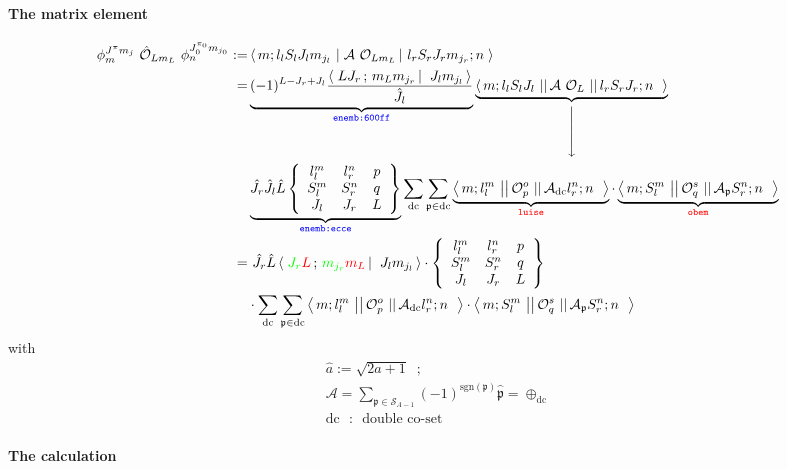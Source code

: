 \documentclass[onecolumn,preprint,superscriptaddress,nofootinbib,notitlepage,10pt,linenumbers]{revtex4-1}
\newcommand{\xdownarrow}[1]{%
  {\left\downarrow\vbox to #1{}\right.\kern-\nulldelimiterspace}
}
\newcommand{\red}[1]{\textcolor{red}{#1}}
\newcommand{\blue}[1]{\textcolor{blue}{#1}}
\newcommand{\green}[1]{\textcolor{green}{#1}}
\newcommand{\la}{\label}
\newcommand{\me}[3] {\left\langle\,#1\,\left|\left.\,#2\,\right|\,#3\,\right.\right\rangle}
\newcommand{\redme}[3] {\left\langle\,#1\,\left|\left|\,#2\,\left|\left|\,#3\,\right.\right.\right.\right.\right\rangle}
\newcommand{\clg}[6]{\ensuremath{\left\langle\left.\,#1#2\,;\,#3#4\,\right\vert\right.\left.\,#5#6\,\right\rangle}}
\begin{document}
\paragraph{The matrix element}
\begin{align}\la{eq.me}
\phi^{J^\pi m_j}_m~\hat{\mathcal{O}}_{Lm_L}~\phi^{J_0^{\pi_0}m_{j_0}}_n:=&
\me{m;l_lS_lJ_lm_{j_l}}{\mathcal{A}~\mathcal{O}_{Lm_L}}{l_rS_rJ_rm_{j_r};n} \\
=&\underbrace{(-1)^{L-J_r+J_l}\frac{\clg{L}{J_r}{m_L}{m_{j_r}}{J_l}{m_{j_l}}}{\hat{J_l}}}_
{\blue{\texttt{enemb:600ff}}}
\underbrace{\redme{m;l_lS_lJ_l}{\mathcal{A}~\mathcal{O}_{L}}{l_rS_rJ_r;n}}_{\xdownarrow{.75cm}}\\
&\underbrace{\hat{J_r}\hat{J_l}\hat{L}
\left\lbrace\begin{array}{ccc}l^m_l & l^n_r & p\\ S^m_l & S^n_r & q \\ J_l & J_r & L\end{array}\right\rbrace}_{\blue{\texttt{enemb:ecce}}}
\sum_\text{dc}\sum_{\mathfrak{p}\in\text{dc}}
\underbrace{\redme{m;l^m_l}{\mathcal{O}^o_p}{\mathcal{A}_\text{dc}l^n_r;n}}_{\red{\texttt{luise}}}\cdot
\underbrace{\redme{m;S^m_l}{\mathcal{O}^s_q}{\mathcal{A}_\mathfrak{p}S^n_r;n}}_{\red{\texttt{obem}}}\\
=&~\hat{J_r}\hat{L}\clg{\green{J_r}}{\red{L}}{\green{m_{j_r}}}{\red{m_L}}{J_l}{m_{j_l}}\cdot
\left\lbrace\begin{array}{ccc}l^m_l & l^n_r & p\\ S^m_l & S^n_r & q \\ J_l & J_r & L\end{array}\right\rbrace\\
&\cdot\sum_\text{dc}\sum_{\mathfrak{p}\in\text{dc}}
\redme{m;l^m_l}{\mathcal{O}^o_p}{\mathcal{A}_\text{dc}l^n_r;n}\cdot
\redme{m;S^m_l}{\mathcal{O}^s_q}{\mathcal{A}_\mathfrak{p}S^n_r;n}
\end{align}
with
\begin{align}\la{eq.liteq.mat.descr}
\hat{a}:=\sqrt{2a+1}\;\;;\\
\mathcal{A}=\sum_{\mathfrak{p}\in\mathcal{S}_{A-1}}(-1)^{\text{sgn}(\mathfrak{p})}\hat{\mathfrak{p}}=\oplus_\text{dc}\\
\text{dc ~:~ double co-set}
\end{align}

\paragraph{The calculation}
\end{document}
